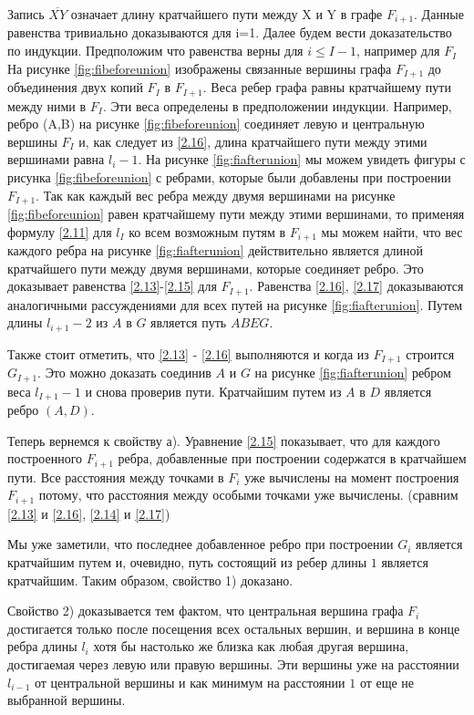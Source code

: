 \documentclass[a4paper, 14pt]{extarticle}
\numberwithin{equation}{section}
\begin{document}
Запись $\overline {XY}$ означает длину кратчайшего пути между X и Y в графе $F_{i+1}$. Данные равенства тривиально доказываются для i=1. Далее будем вести доказательство по индукции. Предположим что равенства верны для $i \leqslant I-1$, например для $F_I$ На рисунке \eqref{fig:fibeforeunion} изображены связанные вершины графа $F_{I+1}$ до объединения двух копий $F_I$ в $F_{I+1}$. Веса ребер графа равны кратчайшему пути между ними в $F_I$. Эти веса определены в предположении индукции. Например, ребро (A,B) на рисунке \eqref{fig:fibeforeunion} соединяет левую и центральную вершины $F_I$ и, как следует из \eqref{2.16}, длина кратчайшего пути между этими вершинами равна $l_i-1$. На рисунке \eqref{fig:fiafterunion} мы можем увидеть фигуры с рисунка \eqref{fig:fibeforeunion} с ребрами, которые были добавлены при построении $F_{I+1}$. Так как каждый вес ребра между двумя вершинами на рисунке \eqref{fig:fibeforeunion} равен кратчайшему пути между этими вершинами, то применяя формулу \eqref{2.11} для $l_I$ ко всем возможным путям в $F_{i+1}$ мы можем найти, что вес каждого ребра на рисунке \eqref{fig:fiafterunion}  действительно является длиной кратчайшего пути между двумя вершинами, которые соединяет ребро. Это доказывает равенства \ref{2.13}-\ref{2.15} для $F_{I+1}$. Равенства \ref{2.16}, \ref{2.17} доказываются аналогичными рассуждениями для всех путей на рисунке \eqref{fig:fiafterunion}. Путем длины $l_{i+1}-2$ из $A$ в $G$ является путь $ABEG$.

Также стоит отметить, что  \ref{2.13} - \ref{2.16} выполняются и когда из $F_{I+1}$ строится $G_{I+1}$. Это можно доказать соединив $A$ и $G$ на рисунке \eqref{fig:fiafterunion} ребром веса $l_{I+1}-1$ и снова проверив пути. Кратчайшим путем из $A$ в $D$ является ребро $(A,D)$.

Теперь вернемся к свойству а). Уравнение \eqref{2.15} показывает, что для каждого построенного $F_{i+1}$ ребра, добавленные при построении содержатся в кратчайшем пути. Все расстояния между точками в $F_i$ уже вычислены на момент построения $F_{i+1}$ потому, что расстояния между особыми точками уже вычислены. (сравним \eqref{2.13} и \eqref{2.16}, \eqref{2.14} и \eqref{2.17})

Мы уже заметили, что последнее добавленное ребро при построении $G_i$ является кратчайшим путем и, очевидно, путь состоящий из ребер длины $1$ является кратчайшим. Таким образом, свойство 1) доказано.

Свойство 2) доказывается тем фактом, что центральная вершина графа $F_i$ достигается только после посещения всех остальных вершин, и вершина в конце ребра длины $l_i$ хотя бы настолько же близка как любая другая вершина, достигаемая через левую или правую вершины. Эти вершины уже на расстоянии $l_{i-1}$ от центральной вершины и как минимум на расстоянии $1$ от еще не выбранной вершины. \\
\end{document}
